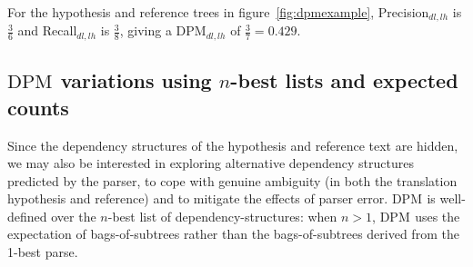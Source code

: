\documentclass[11pt]{article}
\newcommand{\DPM}[1]{\ensuremath{\mathrm{DPM}_{#1}}}
\newcommand{\DPMempty}{\ensuremath{\DPM{}}}
\newcommand{\bDPM}[1]{\ensuremath{\mathrm{b}\DPM{#1}}}
\begin{document}
For the hypothesis and reference trees in figure~\ref{fig:dpmexample},
Precision$_{dl,lh}$ is $\frac{3}{6}$ and Recall$_{dl,lh}$ is
$\frac{3}{8}$, giving a \DPM{dl,lh} of $\frac{3}{7} = 0.429$.


\subsection{\DPMempty{} variations using $n$-best lists and expected counts}
Since the dependency structures of the hypothesis and reference text
are hidden, we may also be interested in exploring alternative
dependency structures predicted by the parser, to cope with genuine
ambiguity (in both the translation hypothesis and reference) and to
mitigate the effects of parser error. \DPMempty{} is well-defined over
the $n$-best list of dependency-structures: when $n>1$, \DPMempty{}
uses the expectation of bags-of-subtrees rather than the
bags-of-subtrees derived from the 1-best parse.
\end{document}

